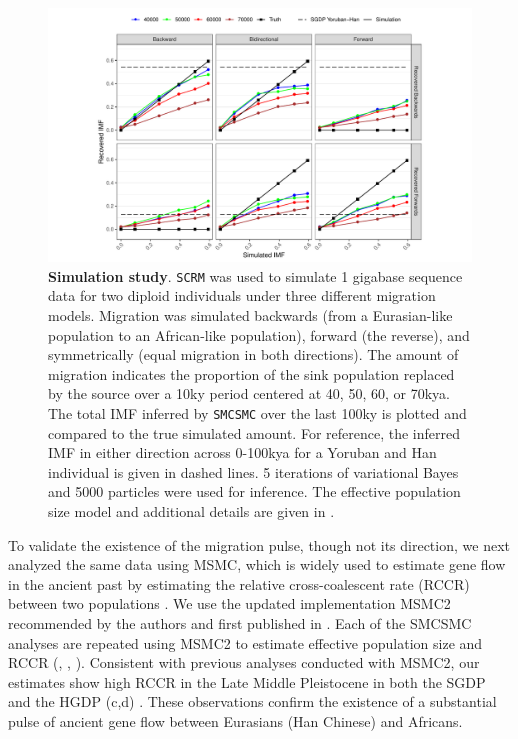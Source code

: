 \begin{figure}
  \centering
  \includegraphics[width=\textwidth]{plot/sim_line_plot.pdf}
  \caption[Simulation Study]{\textbf{Simulation study}. {\tt SCRM} was used to simulate 1 gigabase sequence data for two diploid individuals under three different migration models. Migration was simulated backwards (from a Eurasian-like population to an African-like population), forward (the reverse), and symmetrically (equal migration in both directions). The amount of migration indicates the proportion of the sink population replaced by the source over a 10ky period centered at 40, 50, 60, or 70kya. The total IMF inferred by {\tt SMCSMC} over the last 100ky is plotted and compared to the true simulated amount. For reference, the inferred IMF in either direction across 0-100kya for a Yoruban and Han individual is given in dashed lines.  5 iterations of variational Bayes and 5000 particles were used for inference. The effective population size model and additional details are given in .}
  \label{fig:sim}
\end{figure}


To validate the existence of the migration pulse, though not its direction, we next analyzed the same data using MSMC, which is widely used to estimate gene flow in the ancient past by estimating the relative cross-coalescent rate (RCCR) between two populations \cite{Schiffels2014,Fan2019, Pagani2015, Raghavan2015}. We use the updated implementation MSMC2 recommended by the authors and first published in \cite{Malaspinas2016}. Each of the SMCSMC analyses are repeated using MSMC2 to estimate effective population size and RCCR (, , ). Consistent with previous analyses conducted with MSMC2, our estimates show high RCCR in the Late Middle Pleistocene in both the SGDP and the HGDP (c,d) \cite{Fan2019, Bergstrom2019}. These observations confirm the existence of a substantial pulse of ancient gene flow between Eurasians (Han Chinese) and Africans.


